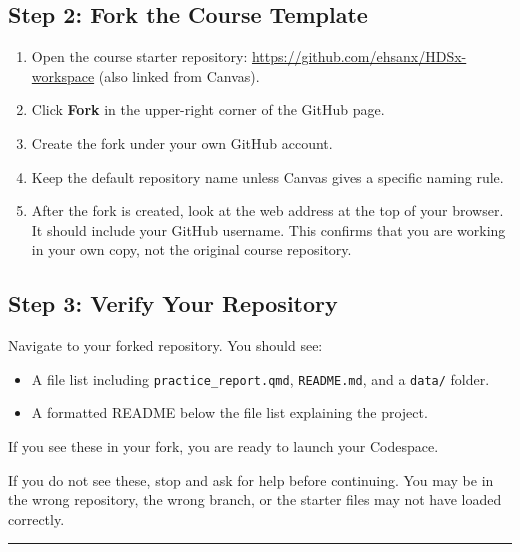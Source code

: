 \documentclass[
  letterpaper,
  DIV=11,
  numbers=noendperiod,
  oneside]{scrreprt}
\providecommand{\tightlist}{%
  \setlength{\itemsep}{0pt}\setlength{\parskip}{0pt}}
\begin{document}
\subsection*{Step 2: Fork the Course
Template}\label{step-2-fork-the-course-template}

\begin{enumerate}
\def\labelenumi{\arabic{enumi}.}
\tightlist
\item
  Open the course starter repository:
  \url{https://github.com/ehsanx/HDSx-workspace} (also linked from
  Canvas).
\item
  Click \textbf{Fork} in the upper-right corner of the GitHub page.
\item
  Create the fork under your own GitHub account.
\item
  Keep the default repository name unless Canvas gives a specific naming
  rule.
\item
  After the fork is created, look at the web address at the top of your
  browser. It should include your GitHub username. This confirms that
  you are working in your own copy, not the original course repository.
\end{enumerate}

\subsection*{Step 3: Verify Your
Repository}\label{step-3-verify-your-repository}

Navigate to your forked repository. You should see:

\begin{itemize}
\tightlist
\item
  A file list including \texttt{practice\_report.qmd},
  \texttt{README.md}, and a \texttt{data/} folder.
\item
  A formatted README below the file list explaining the project.
\end{itemize}

If you see these in your fork, you are ready to launch your Codespace.

If you do not see these, stop and ask for help before continuing. You
may be in the wrong repository, the wrong branch, or the starter files
may not have loaded correctly.

\begin{center}\rule{0.5\linewidth}{0.5pt}\end{center}
\end{document}
